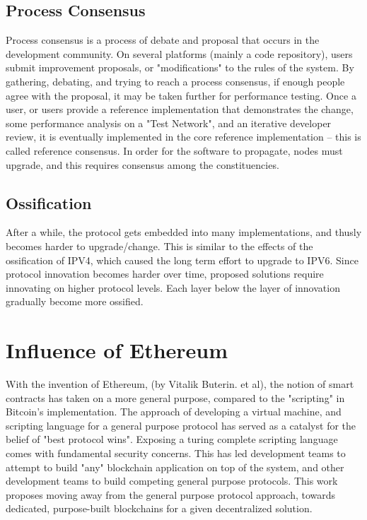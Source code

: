 \documentclass[12pt, titlepage, twocolumn]{report}
\begin{document}
\subsection{Process Consensus}
Process consensus is a process of debate and proposal that occurs in the development community. On several platforms (mainly a code repository), users submit improvement proposals, or "modifications" to the rules of the system. By gathering, debating, and trying to reach a process consensus, if enough people agree with the proposal, it may be taken further for performance testing. Once a user, or users provide a reference implementation that demonstrates the change, some performance analysis on a "Test Network", and an iterative developer review, it is eventually implemented in the core reference implementation -- this is called reference consensus. In order for the software to propagate, nodes must upgrade, and this requires consensus among the constituencies.

\subsection{Ossification}
After a while, the protocol gets embedded into many implementations, and thusly becomes harder to upgrade/change. This is similar to the effects of the ossification of IPV4, which caused the long term effort to upgrade to IPV6. Since protocol innovation becomes harder over time, proposed solutions require innovating on higher protocol levels. Each layer below the layer of innovation gradually become more ossified. 


\section{Influence of Ethereum}
With the invention of Ethereum, (by Vitalik Buterin. et al), the notion of smart contracts has taken on a more general purpose, compared to the "scripting" in Bitcoin's implementation. The approach of developing a virtual machine, and scripting language for a general purpose protocol has served as a catalyst for the belief of "best protocol wins". Exposing a turing complete scripting language comes with fundamental security concerns. This has led development teams to attempt to build "any" blockchain application on top of the system, and other development teams to build competing general purpose protocols. This work proposes moving away from the general purpose protocol approach, towards dedicated, purpose-built blockchains for a given decentralized solution. 
\end{document}
